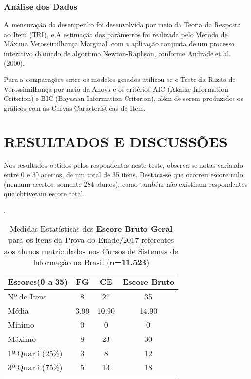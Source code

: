 \documentclass[12pt]{article}
\begin{document}

\subsubsection{Análise dos Dados}

A mensuração do desempenho foi desenvolvida por meio da Teoria da Resposta ao Item (TRI), e A estimação dos parâmetros foi realizada pelo Método de Máxima Verossimilhança Marginal, com a aplicação conjunta de um processo interativo chamado de algoritmo Newton-Raphson, conforme Andrade et al. (2000). 

Para a comparações entre os modelos gerados utilizou-se o Teste da Razão de Verossimilhança por meio da Anova e os critérios AIC (Akaike Information Criterion) e BIC (Bayesian Information Criterion), além de serem produzidos os gráficos com as Curvas Características do Item.

\newpage
\section{RESULTADOS E DISCUSSÕES}
  
Nos resultados obtidos pelos respondentes neste teste, observa-se notas variando entre 0 e 30 acertos, de um total de 35 itens. Destaca-se que ocorreu escore nulo (nenhum acertos, somente 284 alunos), como também não existiram respondentes que obtiveram escore total.  


\begin{table}[htb]
	\centering
	\caption{Medidas Estatísticas dos \textbf{Escore Bruto Geral} para os itens da Prova do Enade/2017 referentes aos alunos matriculados nos Cursos de Sistemas de Informação no Brasil (\textbf{n=11.523})}.
\begin{tabular}{l|c|c|c}
\hline\hline 
 Escores(0 a 35)  & FG      &  CE     & Escore Bruto   \\
\hline\hline
 Nº de Itens      & 8       &  27     &   35           \\
 Média            &  3.99   &  10.90  &   14.90        \\
 Mínimo           &  0      &  0      &   0            \\
 Máximo           &  8      &  23     &  30            \\
 1º Quartil(25\%) &  3      &  8      &   12           \\
 3º Quartil(75\%) &  5      &  13     &   18           \\
\hline\hline
\end{tabular}
\end{table}
\end{document}
